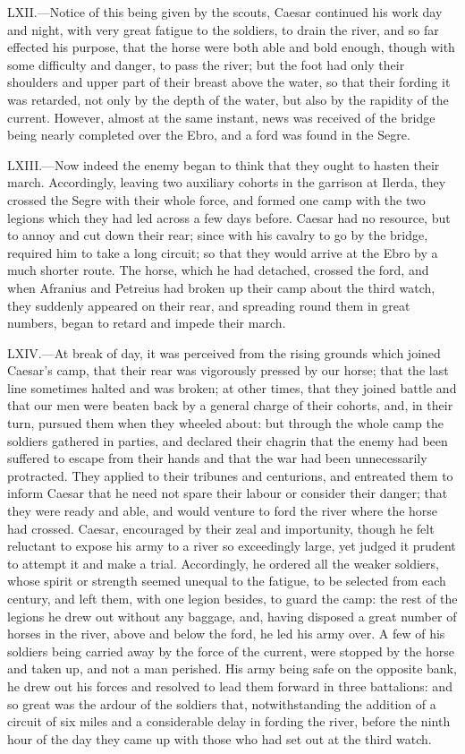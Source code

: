 LXII.—Notice of this being given by the scouts, Caesar continued his
work day and night, with very great fatigue to the soldiers, to drain
the river, and so far effected his purpose, that the horse were both
able and bold enough, though with some difficulty and danger, to pass
the river; but the foot had only their shoulders and upper part of their
breast above the water, so that their fording it was retarded, not only
by the depth of the water, but also by the rapidity of the current.
However, almost at the same instant, news was received of the bridge
being nearly completed over the Ebro, and a ford was found in the Segre.

LXIII.—Now indeed the enemy began to think that they ought to hasten
their march. Accordingly, leaving two auxiliary cohorts in the garrison
at Ilerda, they crossed the Segre with their whole force, and formed one
camp with the two legions which they had led across a few days before.
Caesar had no resource, but to annoy and cut down their rear; since with
his cavalry to go by the bridge, required him to take a long circuit; so
that they would arrive at the Ebro by a much shorter route. The horse,
which he had detached, crossed the ford, and when Afranius and Petreius
had broken up their camp about the third watch, they suddenly appeared
on their rear, and spreading round them in great numbers, began to
retard and impede their march.

LXIV.—At break of day, it was perceived from the rising grounds which
joined Caesar's camp, that their rear was vigorously pressed by our
horse; that the last line sometimes halted and was broken; at other
times, that they joined battle and that our men were beaten back by a
general charge of their cohorts, and, in their turn, pursued them when
they wheeled about: but through the whole camp the soldiers gathered in
parties, and declared their chagrin that the enemy had been suffered to
escape from their hands and that the war had been unnecessarily
protracted. They applied to their tribunes and centurions, and entreated
them to inform Caesar that he need not spare their labour or consider
their danger; that they were ready and able, and would venture to ford
the river where the horse had crossed. Caesar, encouraged by their zeal
and importunity, though he felt reluctant to expose his army to a river
so exceedingly large, yet judged it prudent to attempt it and make a
trial. Accordingly, he ordered all the weaker soldiers, whose spirit or
strength seemed unequal to the fatigue, to be selected from each
century, and left them, with one legion besides, to guard the camp: the
rest of the legions he drew out without any baggage, and, having
disposed a great number of horses in the river, above and below the
ford, he led his army over. A few of his soldiers being carried away by
the force of the current, were stopped by the horse and taken up, and
not a man perished. His army being safe on the opposite bank, he drew
out his forces and resolved to lead them forward in three battalions:
and so great was the ardour of the soldiers that, notwithstanding the
addition of a circuit of six miles and a considerable delay in fording
the river, before the ninth hour of the day they came up with those who
had set out at the third watch.

